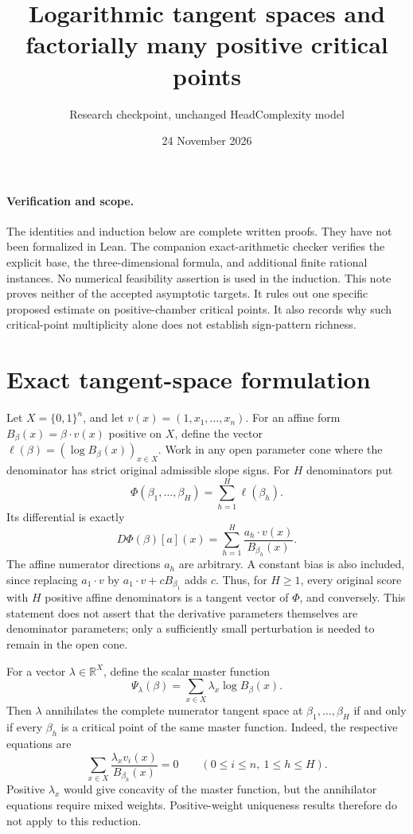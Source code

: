 \documentclass[11pt]{article}
\begin{document}
\title{Logarithmic tangent spaces and factorially many positive critical points}
\author{Research checkpoint, unchanged HeadComplexity model}
\date{24 November 2026}
\maketitle

\paragraph{Verification and scope.}
The identities and induction below are complete written proofs. They have not
been formalized in Lean. The companion exact-arithmetic checker verifies the
explicit base, the three-dimensional formula, and additional finite rational
instances. No numerical feasibility assertion is used in the induction.
This note proves neither of the accepted asymptotic targets. It rules out one
specific proposed estimate on positive-chamber critical points. It also records
why such critical-point multiplicity alone does not establish sign-pattern
richness.

\section{Exact tangent-space formulation}

Let $X=\{0,1\}^n$, and let $v(x)=(1,x_1,\ldots,x_n)$. For an affine form
$B_\beta(x)=\beta\cdot v(x)$ positive on $X$, define the vector
$\ell(\beta)=(\log B_\beta(x))_{x\in X}$. Work in any open parameter cone
where the denominator has strict original admissible slope signs. For $H$
denominators put
\[
 \Phi(\beta_1,\ldots,\beta_H)=\sum_{h=1}^H\ell(\beta_h).
\]
Its differential is exactly
\[
 D\Phi(\beta)[a](x)=\sum_{h=1}^H
       \frac{a_h\cdot v(x)}{B_{\beta_h}(x)}.
\]
The affine numerator directions $a_h$ are arbitrary. A constant bias is also
included, since replacing $a_1\cdot v$ by $a_1\cdot v+cB_{\beta_1}$ adds $c$.
Thus, for $H\geq1$, every original score with $H$ positive affine denominators
is a tangent vector of $\Phi$, and conversely. This statement does not assert
that the derivative parameters themselves are denominator parameters; only a
sufficiently small perturbation is needed to remain in the open cone.

For a vector $\lambda\in\mathbb R^X$, define the scalar master function
\[
 \Psi_\lambda(\beta)=\sum_{x\in X}\lambda_x\log B_\beta(x).
\]
Then $\lambda$ annihilates the complete numerator tangent space at
$\beta_1,\ldots,\beta_H$ if and only if every $\beta_h$ is a critical point of
the same master function. Indeed, the respective equations are
\[
 \sum_{x\in X}\frac{\lambda_xv_i(x)}{B_{\beta_h}(x)}=0
 \qquad(0\leq i\leq n,\ 1\leq h\leq H).
\]
Positive $\lambda_x$ would give concavity of the master function, but the
annihilator equations require mixed weights. Positive-weight uniqueness
results therefore do not apply to this reduction.
\end{document}
